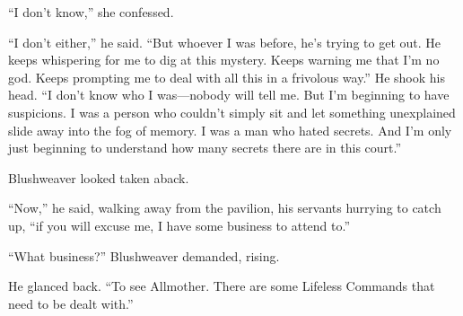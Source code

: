 “I don’t know,” she confessed.

“I don’t either,” he said. “But whoever I was before, he’s trying to get out. He keeps whispering for me to dig at this mystery. Keeps warning me that I’m no god. Keeps prompting me to deal with all this in a frivolous way.” He shook his head. “I don’t know who I was—nobody will tell me. But I’m beginning to have suspicions. I was a person who couldn’t simply sit and let something unexplained slide away into the fog of memory. I was a man who hated secrets. And I’m only just beginning to understand how many secrets there are in this court.”

Blushweaver looked taken aback.

“Now,” he said, walking away from the pavilion, his servants hurrying to catch up, “if you will excuse me, I have some business to attend to.”

“What business?” Blushweaver demanded, rising.

He glanced back. “To see Allmother. There are some Lifeless Commands that need to be dealt with.”

